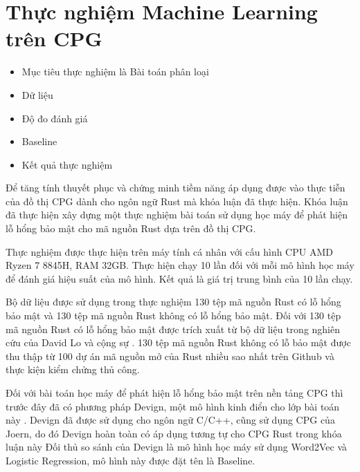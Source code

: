 \section{Thực nghiệm Machine Learning trên CPG}

\begin{itemize}
    \item Mục tiêu thực nghiệm là Bài toán phân loại
    \item Dữ liệu
    \item Độ đo đánh giá
    \item Baseline
    \item Kết quả thực nghiệm
\end{itemize}

Để tăng tính thuyết phục và chứng minh tiềm năng áp dụng được vào thực tiễn của đồ thị CPG dành cho ngôn ngữ Rust mà khóa luận đã thực hiện.
Khóa luận đã thực hiện xây dựng một thực nghiệm bài toán sử dụng học máy để phát hiện lỗ hổng bảo mật cho mã nguồn Rust dựa trên đồ thị CPG.

Thực nghiệm được thực hiện trên máy tính cá nhân với cấu hình CPU AMD Ryzen 7 8845H, RAM 32GB.
Thực hiện chạy 10 lần đối với mỗi mô hình học máy để đánh giá hiệu suất của mô hình.
Kết quả là giá trị trung bình của 10 lần chạy.

Bộ dữ liệu được sử dụng trong thực nghiệm 130 tệp mã nguồn Rust có lỗ hổng bảo mật và 130 tệp mã nguồn Rust không có lỗ hổng bảo mật.
Đối với 130 tệp mã nguồn Rust có lỗ hổng bảo mật được trích xuất từ bộ dữ liệu trong nghiên cứu của David Lo và cộng sự \cite{zheng2023closer}.
130 tệp mã nguồn Rust không có lỗ bảo mật được thu thập từ 100 dự án mã nguồn mở của Rust nhiều sao nhất trên Github \cite{githubGithubRankingTop100RustmdMaster} và thực kiện kiểm chửng thủ công.

Đối với bài toán học máy để phát hiện lỗ hổng bảo mật trên nền tảng CPG thì trước đây đã có phương pháp Devign, một mô hình kinh điển cho lớp bài toán này \cite{zhou2019devign}.
Devign đã được sử dụng cho ngôn ngữ C/C++, cũng sử dụng CPG của Joern, do đó Devign hoàn toàn có áp dụng tương tự cho CPG Rust trong khóa luận này
Đối thủ so sánh của Devign là mô hình học máy sử dụng Word2Vec và Logistic Regression, mô hình này được đặt tên là Baseline.

